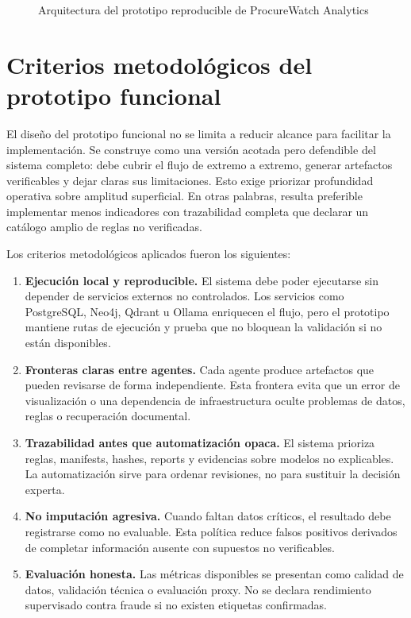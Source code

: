 \documentclass[11pt,a4paper,spanish]{book}
\numberwithin{equation}{chapter}
\numberwithin{figure}{chapter}
\begin{document}
\begin{figure}[h]
\centering
\caption{Arquitectura del prototipo reproducible de ProcureWatch Analytics}
\label{fig:arquitectura_mermaid}
\resizebox{0.98\textwidth}{!}{}
\end{figure}

\section{Criterios metodol{\'o}gicos del prototipo funcional}
\label{sec:criterios_metodologicos_mvp}

El dise{\~n}o del prototipo funcional no se limita a reducir alcance para facilitar la implementaci{\'o}n. Se construye
como una versi{\'o}n acotada pero defendible del sistema completo: debe cubrir el flujo de extremo a
extremo, generar artefactos verificables y dejar claras sus limitaciones. Esto exige priorizar
profundidad operativa sobre amplitud superficial. En otras palabras, resulta preferible implementar
menos indicadores con trazabilidad completa que declarar un cat{\'a}logo amplio de reglas no
verificadas.

Los criterios metodol{\'o}gicos aplicados fueron los siguientes:

\begin{enumerate}
  \item \textbf{Ejecuci{\'o}n local y reproducible.} El sistema debe poder ejecutarse sin depender de
  servicios externos no controlados. Los servicios como PostgreSQL, Neo4j, Qdrant u Ollama enriquecen
  el flujo, pero el prototipo mantiene rutas de ejecuci{\'o}n y prueba que no bloquean la validaci{\'o}n si no
  est{\'a}n disponibles.
  \item \textbf{Fronteras claras entre agentes.} Cada agente produce artefactos que pueden revisarse
  de forma independiente. Esta frontera evita que un error de visualizaci{\'o}n o una dependencia de
  infraestructura oculte problemas de datos, reglas o recuperaci{\'o}n documental.
  \item \textbf{Trazabilidad antes que automatizaci{\'o}n opaca.} El sistema prioriza reglas,
  manifests, hashes, reports y evidencias sobre modelos no explicables. La automatizaci{\'o}n sirve
  para ordenar revisiones, no para sustituir la decisi{\'o}n experta.
  \item \textbf{No imputaci{\'o}n agresiva.} Cuando faltan datos cr{\'i}ticos, el resultado debe
  registrarse como no evaluable. Esta pol{\'i}tica reduce falsos positivos derivados de completar
  informaci{\'o}n ausente con supuestos no verificables.
  \item \textbf{Evaluaci{\'o}n honesta.} Las m{\'e}tricas disponibles se presentan como calidad de datos,
  validaci{\'o}n t{\'e}cnica o evaluaci{\'o}n proxy. No se declara rendimiento supervisado contra fraude
  si no existen etiquetas confirmadas.
\end{enumerate}
\end{document}
